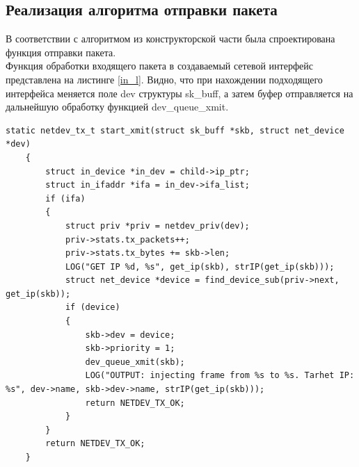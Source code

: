 \documentclass[14pt, a4paper]{extarticle}
\begin{document}
\subsection{Реализация алгоритма отправки пакета}
В соответствии с алгоритмом из конструкторской части была спроектирована функция отправки пакета. \\
\indent Функция обработки входящего пакета в создаваемый сетевой интерфейс представлена на листинге \ref{in_l}. Видно, что при нахождении подходящего интерфейса меняется поле dev структуры sk\_buff, а затем буфер отправляется на дальнейшую обработку функцией dev\_queue\_xmit.
\begin{lstlisting}[caption=start\_xmit, label=in_l]
	static netdev_tx_t start_xmit(struct sk_buff *skb, struct net_device *dev)
	{
		struct in_device *in_dev = child->ip_ptr;
		struct in_ifaddr *ifa = in_dev->ifa_list;
		if (ifa) 
		{
			struct priv *priv = netdev_priv(dev);
			priv->stats.tx_packets++;
			priv->stats.tx_bytes += skb->len;
			LOG("GET IP %d, %s", get_ip(skb), strIP(get_ip(skb)));
			struct net_device *device = find_device_sub(priv->next, get_ip(skb));
			if (device)
			{
				skb->dev = device;
				skb->priority = 1;
				dev_queue_xmit(skb);
				LOG("OUTPUT: injecting frame from %s to %s. Tarhet IP: %s", dev->name, skb->dev->name, strIP(get_ip(skb)));
				return NETDEV_TX_OK;
			}
		}
		return NETDEV_TX_OK;
	}
\end{lstlisting}
\end{document}
